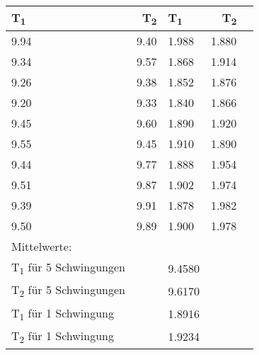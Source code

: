 \documentclass[titlepage=firstcover, captions=tableheading]{scrartcl}
\begin{document}
\begin{center}
    \begin{tabular}{lrlrr}
        \toprule
        {T\textsubscript{1}} & {T\textsubscript{2}} & {T\textsubscript{1}} & {T\textsubscript{2}} \\
        \midrule
        9.94  & 	9.40  &  1.988  &  1.880 \\
        9.34  & 	9.57  &  1.868  &  1.914 \\
        9.26  & 	9.38  &  1.852  &  1.876 \\
        9.20  &     9.33  &  1.840  &  1.866 \\
        9.45  & 	9.60  &  1.890  &  1.920 \\
        9.55  & 	9.45  &  1.910  &  1.890 \\
        9.44  & 	9.77  &  1.888  &  1.954 \\
        9.51  & 	9.87  &  1.902  &  1.974 \\
        9.39  & 	9.91  &  1.878  &  1.982 \\
        9.50  &     9.89  &  1.900  &  1.978 \\
        \midrule
        Mittelwerte:\\
        T\textsubscript{1} für 5  Schwingungen & & 9.4580 \\
        T\textsubscript{2} für 5  Schwingungen & & 9.6170 \\
        T\textsubscript{1} für 1  Schwingung & & 1.8916 \\
        T\textsubscript{2} für 1  Schwingung & & 1.9234 \\
        \bottomrule
        
    \end{tabular}
\end{center}
\end{document}
